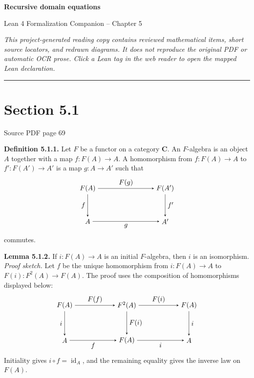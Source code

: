 \documentclass[11pt]{article}
\newcommand{\leanmarker}[2]{%
  \Needspace{3\baselineskip}%
  \marginnote{\hyperlink{#1}{\color{LeanTeal}\fbox{\scriptsize Lean}}}%
  \hypertarget{#1}{\textbf{#2.}}%
}
\newcommand{\sourcepage}[1]{\par\medskip\noindent\textcolor{SourceGray}{\scriptsize Source PDF page #1}\par\smallskip}
\begin{document}
\begin{center}\LARGE\bfseries Recursive domain equations\par\medskip
\large Lean 4 Formalization Companion -- Chapter 5\end{center}
\medskip
\noindent\textit{This project-generated reading copy contains reviewed mathematical items, short source locators, and redrawn diagrams. It does not reproduce the original PDF or automatic OCR prose. Click a Lean tag in the web reader to open the mapped Lean declaration.}
\bigskip\hrule\bigskip
\section*{Section 5.1}
\sourcepage{69}
\leanmarker{def-5-1-1}{Definition 5.1.1} Let \(F\) be a functor on a category \(\mathbf C\). An \(F\)-algebra is an object \(A\) together with a map \(f:F(A)\to A\). A homomorphism from \(f:F(A)\to A\) to \(f':F(A')\to A'\) is a map \(g:A\to A'\) such that
\[
\begin{tikzpicture}[baseline=(current bounding box.center), >=stealth]
  \node (FA)  at (0,1.7) {$F(A)$};
  \node (FAp) at (4.0,1.7) {$F(A')$};
  \node (A)   at (0,0) {$A$};
  \node (Ap)  at (4.0,0) {$A'$};
  \draw[->] (FA) -- node[above] {$F(g)$} (FAp);
  \draw[->] (FA) -- node[left] {$f$} (A);
  \draw[->] (FAp) -- node[right] {$f'$} (Ap);
  \draw[->] (A) -- node[below] {$g$} (Ap);
\end{tikzpicture}
\]
commutes.

\leanmarker{lemma-5-1-2}{Lemma 5.1.2} If \(i:F(A)\to A\) is an initial \(F\)-algebra, then \(i\) is an isomorphism.
\emph{Proof sketch.} Let \(f\) be the unique homomorphism from \(i:F(A)\to A\) to \(F(i):F^2(A)\to F(A)\). The proof uses the composition of homomorphisms displayed below:
\[
\begin{tikzpicture}[baseline=(current bounding box.center), >=stealth]
  \node (FA0) at (0,1.8) {$F(A)$};
  \node (F2A) at (3.2,1.8) {$F^2(A)$};
  \node (FA1) at (6.4,1.8) {$F(A)$};
  \node (A0)  at (0,0) {$A$};
  \node (FA2) at (3.2,0) {$F(A)$};
  \node (A1)  at (6.4,0) {$A$};
  \draw[->] (FA0) -- node[above] {$F(f)$} (F2A);
  \draw[->] (F2A) -- node[above] {$F(i)$} (FA1);
  \draw[->] (FA0) -- node[left] {$i$} (A0);
  \draw[->] (F2A) -- node[right] {$F(i)$} (FA2);
  \draw[->] (FA1) -- node[right] {$i$} (A1);
  \draw[->] (A0) -- node[below] {$f$} (FA2);
  \draw[->] (FA2) -- node[below] {$i$} (A1);
\end{tikzpicture}
\]
Initiality gives \(i\circ f=\operatorname{id}_A\), and the remaining equality gives the inverse law on \(F(A)\).
\end{document}
